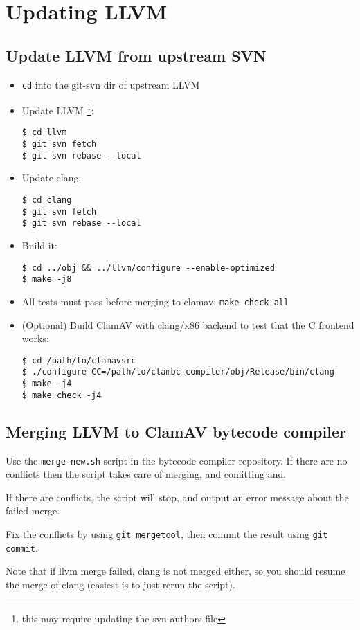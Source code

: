 \chapter{Updating LLVM}
\section{Update LLVM from upstream SVN}
\begin{itemize}
\item \verb+cd+ into the git-svn dir of upstream LLVM
\item Update LLVM \footnote{this may require updating the svn-authors file}:
\begin{verbatim}
$ cd llvm
$ git svn fetch
$ git svn rebase --local
\end{verbatim}
\item Update clang:
\begin{verbatim}
$ cd clang
$ git svn fetch
$ git svn rebase --local
\end{verbatim}
\item Build it:
\begin{verbatim}
$ cd ../obj && ../llvm/configure --enable-optimized
$ make -j8
\end{verbatim}
\item All tests must pass before merging to clamav: \verb+make check-all+
\item (Optional) Build ClamAV with clang/x86 backend to test that the C frontend
works:
\begin{verbatim}
$ cd /path/to/clamavsrc
$ ./configure CC=/path/to/clambc-compiler/obj/Release/bin/clang
$ make -j4
$ make check -j4
\end{verbatim}
\end{itemize}

\section{Merging LLVM to ClamAV bytecode compiler}
Use the \verb+merge-new.sh+ script in the bytecode compiler repository.
If there are no conflicts then the script takes care of merging, and comitting
and.

If there are conflicts, the script will stop, and output an error message about
the failed merge.

Fix the conflicts by using \verb+git mergetool+, then
commit the result using \verb+git commit+.

Note that if llvm merge failed, clang is not merged either, so you should resume
the merge of clang (easiest is to just rerun the script).

